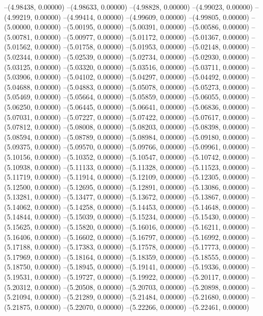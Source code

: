 --(4.98438, 0.00000)
--(4.98633, 0.00000)
--(4.98828, 0.00000)
--(4.99023, 0.00000)
--(4.99219, 0.00000)
--(4.99414, 0.00000)
--(4.99609, 0.00000)
--(4.99805, 0.00000)
--(5.00000, 0.00000)
--(5.00195, 0.00000)
--(5.00391, 0.00000)
--(5.00586, 0.00000)
--(5.00781, 0.00000)
--(5.00977, 0.00000)
--(5.01172, 0.00000)
--(5.01367, 0.00000)
--(5.01562, 0.00000)
--(5.01758, 0.00000)
--(5.01953, 0.00000)
--(5.02148, 0.00000)
--(5.02344, 0.00000)
--(5.02539, 0.00000)
--(5.02734, 0.00000)
--(5.02930, 0.00000)
--(5.03125, 0.00000)
--(5.03320, 0.00000)
--(5.03516, 0.00000)
--(5.03711, 0.00000)
--(5.03906, 0.00000)
--(5.04102, 0.00000)
--(5.04297, 0.00000)
--(5.04492, 0.00000)
--(5.04688, 0.00000)
--(5.04883, 0.00000)
--(5.05078, 0.00000)
--(5.05273, 0.00000)
--(5.05469, 0.00000)
--(5.05664, 0.00000)
--(5.05859, 0.00000)
--(5.06055, 0.00000)
--(5.06250, 0.00000)
--(5.06445, 0.00000)
--(5.06641, 0.00000)
--(5.06836, 0.00000)
--(5.07031, 0.00000)
--(5.07227, 0.00000)
--(5.07422, 0.00000)
--(5.07617, 0.00000)
--(5.07812, 0.00000)
--(5.08008, 0.00000)
--(5.08203, 0.00000)
--(5.08398, 0.00000)
--(5.08594, 0.00000)
--(5.08789, 0.00000)
--(5.08984, 0.00000)
--(5.09180, 0.00000)
--(5.09375, 0.00000)
--(5.09570, 0.00000)
--(5.09766, 0.00000)
--(5.09961, 0.00000)
--(5.10156, 0.00000)
--(5.10352, 0.00000)
--(5.10547, 0.00000)
--(5.10742, 0.00000)
--(5.10938, 0.00000)
--(5.11133, 0.00000)
--(5.11328, 0.00000)
--(5.11523, 0.00000)
--(5.11719, 0.00000)
--(5.11914, 0.00000)
--(5.12109, 0.00000)
--(5.12305, 0.00000)
--(5.12500, 0.00000)
--(5.12695, 0.00000)
--(5.12891, 0.00000)
--(5.13086, 0.00000)
--(5.13281, 0.00000)
--(5.13477, 0.00000)
--(5.13672, 0.00000)
--(5.13867, 0.00000)
--(5.14062, 0.00000)
--(5.14258, 0.00000)
--(5.14453, 0.00000)
--(5.14648, 0.00000)
--(5.14844, 0.00000)
--(5.15039, 0.00000)
--(5.15234, 0.00000)
--(5.15430, 0.00000)
--(5.15625, 0.00000)
--(5.15820, 0.00000)
--(5.16016, 0.00000)
--(5.16211, 0.00000)
--(5.16406, 0.00000)
--(5.16602, 0.00000)
--(5.16797, 0.00000)
--(5.16992, 0.00000)
--(5.17188, 0.00000)
--(5.17383, 0.00000)
--(5.17578, 0.00000)
--(5.17773, 0.00000)
--(5.17969, 0.00000)
--(5.18164, 0.00000)
--(5.18359, 0.00000)
--(5.18555, 0.00000)
--(5.18750, 0.00000)
--(5.18945, 0.00000)
--(5.19141, 0.00000)
--(5.19336, 0.00000)
--(5.19531, 0.00000)
--(5.19727, 0.00000)
--(5.19922, 0.00000)
--(5.20117, 0.00000)
--(5.20312, 0.00000)
--(5.20508, 0.00000)
--(5.20703, 0.00000)
--(5.20898, 0.00000)
--(5.21094, 0.00000)
--(5.21289, 0.00000)
--(5.21484, 0.00000)
--(5.21680, 0.00000)
--(5.21875, 0.00000)
--(5.22070, 0.00000)
--(5.22266, 0.00000)
--(5.22461, 0.00000)

